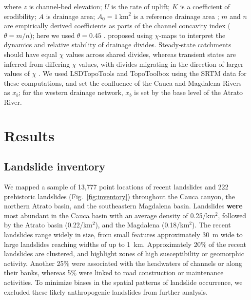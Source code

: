 \documentclass[draft]{agujournal2019}
\begin{document}
where $z$ is channel-bed elevation; $U$ is the rate of uplift; $K$ is a coefficient of erodibility; $A$ is drainage area; $A_0=1~\mathrm{km}^2$ is a reference drainage area \cite{whipple2017}; $m$ and $n$ are empirically derived coefficients as parts of the channel concavity index ($\theta=m/n$); here we used $\theta=0.45$ \cite{Wobus2006}.  proposed using $\chi$-maps to interpret the dynamics and relative stability of drainage divides. Steady-state catchments should have equal $\chi$ values across shared divides, whereas transient states are inferred from differing $\chi$ values, with divides migrating in the direction of larger values of $\chi$ \cite{Willett2014}. We used LSDTopoTools \cite{Mudd2014} and TopoToolbox \cite{Schwanghart_2014} using the SRTM data for these computations, and set the confluence of the Cauca and Magdalena Rivers as $x_b$; for the western drainage network, $x_b$ is set by the base level of the Atrato River.


\section{Results}

\subsection{Landslide inventory}

\par We mapped a sample of 13,777 point locations of recent landslides and 222 prehistoric landslides (Fig.~\ref{fig:inventory}) throughout the Cauca canyon, the northern Atrato basin, and the southeastern Magdalena basin. Landslides \textbf{were} most abundant in the Cauca basin with an average density of 0.25/km$^{2}$, followed by the Atrato basin (0.22/km$^{2}$), and the Magdalena (0.18/km$^{2}$). The recent landslides range widely in size, from small features approximately 30~m wide to large landslides reaching widths of up to 1~km. Approximately 20\% of the recent landslides are clustered, and highlight zones of high susceptibility or geomorphic activity. Another 25\% were associated with the headwaters of channels or along their banks, whereas 5\% were linked to road construction or maintenance activities. To minimize biases in the spatial patterns of landslide occurrence, we excluded these likely anthropogenic landslides from further analysis.  
\end{document}
